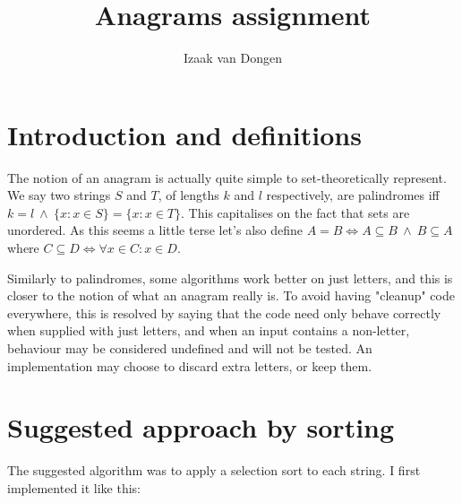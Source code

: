 \documentclass{article}
\title{Anagrams assignment}
\author{Izaak van Dongen}
\begin{document}
    \maketitle
    \tableofcontents

    \section{Introduction and definitions}

    The notion of an anagram is actually quite simple to set-theoretically
    represent. We say two strings $S$ and $T$, of lengths $k$ and $l$
    respectively, are palindromes iff
    $k = l\ \land\ \{x: x \in S\} = \{x: x \in T\}$.
    This capitalises on the fact that sets are unordered. As this seems a
    little terse let's also define
    $A = B \iff A \subseteq B\ \land\ B \subseteq A$
    where
    $C \subseteq D \iff \forall x \in C: x \in D$.

    Similarly to palindromes, some algorithms work better on just letters, and
    this is closer to the notion of what an anagram really is. To avoid having
    "cleanup" code everywhere, this is resolved by saying that the code need
    only behave correctly when supplied with just letters, and when an input
    contains a non-letter, behaviour may be considered undefined and will not
    be tested. An implementation may choose to discard extra letters, or keep
    them.

    \section{Suggested approach by sorting}

    The suggested algorithm was to apply a selection sort to each string. I
    first implemented it like this:
\end{document}
